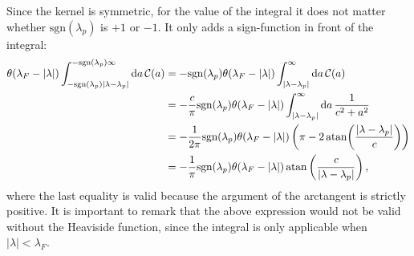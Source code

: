 \documentclass[11pt, a4paper]{report} %
\newcommand{\kernel}{\mathcal{C}}
\begin{document}
Since the kernel is symmetric, for the value of the integral it does not matter whether \(\mathrm{sgn}(\lambda_p)\) is \(+1\) or \(-1\).
It only adds a sign-function in front of the integral:
\begin{align}
	\theta(\lambda_F - \lvert \lambda \rvert) \int_{-\textrm{sgn}(\lambda_p)\lvert\lambda-\lambda_p\rvert}^{ - \textrm{sgn}(\lambda_p)\infty} \dd a\,\kernel(a) &= - \textrm{sgn}(\lambda_p) \theta(\lambda_F - \lvert \lambda \rvert) \int_{\lvert\lambda-\lambda_p\rvert}^{\infty} \dd a\,\kernel(a)\\
	&= - \frac{c}{\pi} \textrm{sgn}(\lambda_p) \theta(\lambda_F - \lvert \lambda \rvert)  \int_{\lvert\lambda-\lambda_p\rvert}^{\infty} \dd a\,\frac{1}{c^2 + a^2}\\
	&= - \frac{1}{2\pi} \textrm{sgn}(\lambda_p) \theta(\lambda_F - \lvert \lambda \rvert)  \left( \pi - 2\atan(\frac{\lvert \lambda - \lambda_p\rvert}{c})\right)\label{eq:dpdeltanonsimplified}\\
	&= - \frac{1}{\pi} \textrm{sgn}(\lambda_p) \theta(\lambda_F - \lvert \lambda \rvert)  \atan\left(\frac{c}{\lvert\lambda-\lambda_p\rvert}\right),
\end{align}
where the last equality is valid because the argument of the arctangent is strictly positive.
It is important to remark that the above expression would not be valid without the Heaviside function, since the integral is only applicable when \(\lvert\lambda\rvert< \lambda_F\).
\end{document}

